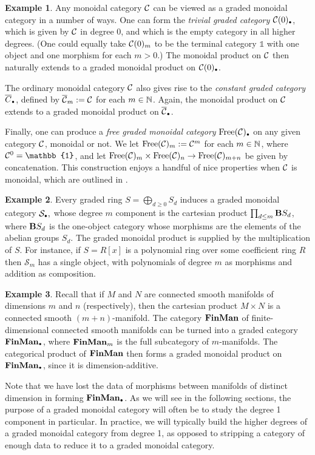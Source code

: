 \documentclass[openany, amssymb, psamsfonts]{amsart}
\theoremstyle{definition}
\newtheorem{exmp}{Example}[section]
\numberwithin{equation}{section}
\begin{document}
\begin{exmp} 
    Any monoidal category $\mathcal{C}$ can be viewed as a graded monoidal category in a number of ways. One can form the \emph{trivial graded category} $\C(0)_\sbull$, which is given by $\mathcal{C}$ in degree 0, and which is the empty category in all higher degrees. (One could equally take $\mathcal{C}(0)_m$ to be the terminal category $\mathbb{1}$ with one object and one morphism for each $m > 0$.) The monoidal product on $\mathcal{C}$ then naturally extends to a graded monoidal product on $\C(0)_\sbull$. 

    The ordinary monoidal category $\mathcal{C}$ also gives rise to the \emph{constant graded category} $\overline{C}_\sbull$, defined by $\overline{\mathcal{C}}_m := \mathcal{C}$ for each $m \in \mathbb{N}$. Again, the monoidal product on $\mathcal{C}$ extends to a graded monoidal product on $\overline{\C}_\sbull$.

    Finally, one can produce a \emph{free graded monoidal category} $\Free(\C)_\sbull$ on any given category $\mathcal{C}$, monoidal or not. We let $\mathrm{Free}(\mathcal{C})_m := \mathcal{C}^m$ for each $m \in \mathbb{N}$, where $\C^0 = \mathbb{1}$, and let $\mathrm{Free}(\mathcal{C})_m \times \mathrm{Free}(\mathcal{C})_n \to \mathrm{Free}(\mathcal{C})_{m + n}$ be given by concatenation. This construction enjoys a handful of nice properties when $\mathcal{C}$ is monoidal, which are outlined in .
\end{exmp}

\begin{exmp}
    Every graded ring $S = \bigoplus_{d \geq 0} S_d$ induces a graded monoidal category $\mathcal{S}_\sbull,$ whose degree $m$ component is the cartesian product $\prod_{d \leq m} \textbf{\textup{B}} S_d$, where $\textbf{\textup{B}} S_d$ is the one-object category whose morphisms are the elements of the abelian groups $S_d$. The graded monoidal product is supplied by the multiplication of $S$. For instance, if $S = R[x]$ is a polynomial ring over some coefficient ring $R$ then $\mathcal{S}_m$ has a single object, with polynomials of degree $m$ as morphisms and addition as composition.
\end{exmp}

\begin{exmp} 
    Recall that if $M$ and $N$ are connected smooth manifolds of dimensions $m$ and $n$ (respectively), then the cartesian product $M \times N$ is a connected smooth $(m + n)$-manifold. The category $\textbf{\textup{FinMan}}$ of finite-dimensional connected smooth manifolds can be turned into a graded category $\categ{FinMan}_\sbull$, where $\textbf{\textup{FinMan}}_m$ is the full subcategory of $m$-manifolds. The categorical product of $\textbf{\textup{FinMan}}$ then forms a graded monoidal product on $\categ{FinMan}_\sbull$, since it is dimension-additive.
    
    Note that we have lost the data of morphisms between manifolds of distinct dimension in forming $\categ{FinMan}_\sbull$. As we will see in the following sections, the purpose of a graded monoidal category will often be to study the degree 1 component in particular. In practice, we will typically build the higher degrees of a graded monoidal category from degree 1, as opposed to stripping a category of enough data to reduce it to a graded monoidal category.
\end{exmp}
\end{document}
